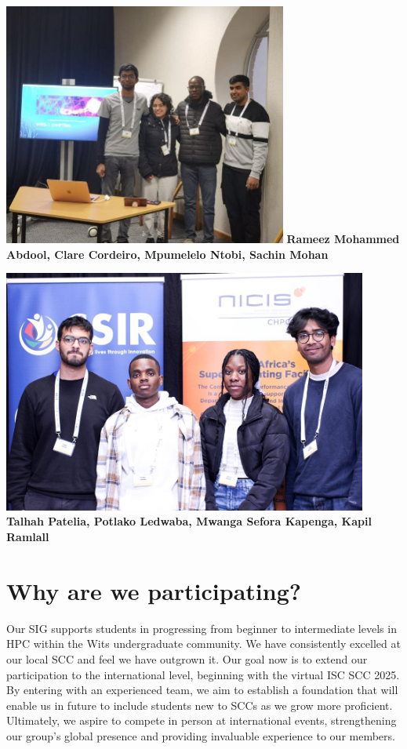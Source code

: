\documentclass[10pt, onecolumn]{IEEEtran}
\begin{document}
\\\\
\begin{minipage}{0.45\textwidth}
  \centering
  \includegraphics[width=0.7\textwidth]{wits1.jpg}
  \textbf{Rameez Mohammed Abdool, Clare Cordeiro, Mpumelelo Ntobi, Sachin Mohan} 
\end{minipage}
\hspace{0.05\textwidth} %
\begin{minipage}{0.45\textwidth}
  \centering
  \includegraphics[width=0.9\textwidth]{witsa.jpg}
  \textbf{Talhah Patelia, Potlako Ledwaba, Mwanga Sefora Kapenga, Kapil Ramlall} 
\end{minipage}

\section{Why are we participating?}
\noindent
Our SIG supports students in progressing from beginner to intermediate levels in HPC within the Wits undergraduate community. We have consistently excelled at our local SCC and feel we have outgrown it. Our goal now is to extend our participation to the international level, beginning with the virtual ISC SCC 2025. By entering with an experienced team, we aim to establish a foundation that will enable us in future to include students new to SCCs as we grow more proficient. Ultimately, we aspire to compete in person at international events, strengthening our group's global presence and providing invaluable experience to our members.
\end{document}
